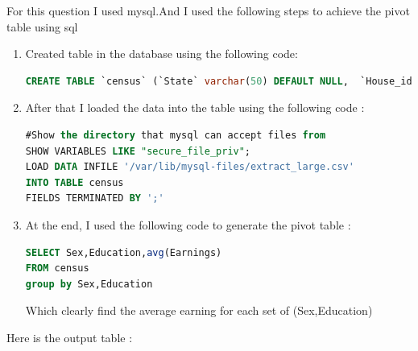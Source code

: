 \documentclass{article}
\begin{document}
For this question I used mysql.And I used the following steps to achieve the pivot table using sql 
\begin{enumerate}
\item Created table in the database using the following code:
\begin{lstlisting}[language=SQL]
CREATE TABLE `census` (`State` varchar(50) DEFAULT NULL,  `House_id` varchar(50) DEFAULT NULL,  `Weight` varchar(50) DEFAULT NULL,  `House_relation` varchar(50) DEFAULT NULL,  `Sex` varchar(50) DEFAULT NULL,  `Age` varchar(50) DEFAULT NULL,  `Race` varchar(50) DEFAULT NULL,  `Marriage` varchar(50) DEFAULT NULL,  `Education` varchar(50) DEFAULT NULL,  `Ancestry` varchar(50) DEFAULT NULL,  `Language` varchar(50) DEFAULT NULL,  `Employment_status` varchar(50) DEFAULT NULL,  `Traveltime` varchar(50) DEFAULT NULL,  `Industry` varchar(50) DEFAULT NULL,  `Occupation` varchar(50) DEFAULT NULL,  `Hours` varchar(50) DEFAULT NULL,  `Weeks` varchar(50) DEFAULT NULL,  `Salary` varchar(50) DEFAULT NULL,  `Income` varchar(50) DEFAULT NULL,  `Earnings` int(20) DEFAULT NULL)
\end{lstlisting}
\item After that I loaded the data into the table using the following code : 
\begin{lstlisting}[language=SQL]
#Show the directory that mysql can accept files from
SHOW VARIABLES LIKE "secure_file_priv";
LOAD DATA INFILE '/var/lib/mysql-files/extract_large.csv' 
INTO TABLE census
FIELDS TERMINATED BY ';'
\end{lstlisting}

\item At the end, I used the following code to generate the pivot table :
\begin{lstlisting}[language=SQL]
SELECT Sex,Education,avg(Earnings)
FROM census
group by Sex,Education
\end{lstlisting}
Which clearly find the average earning for each set of (Sex,Education)
\end{enumerate}
Here is the output table :\\
\end{document}
